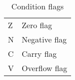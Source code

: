 \begin{table}[h]
	\centering
	\begin{tabular}{|l l|}
		\hline
		Z & Zero flag \\
		N & Negative flag \\
		C & Carry flag \\
		V & Overflow flag \\
		\hline
	\end{tabular}
	\caption{Condition flags}
	\label{tab:condition_flags}
\end{table}
